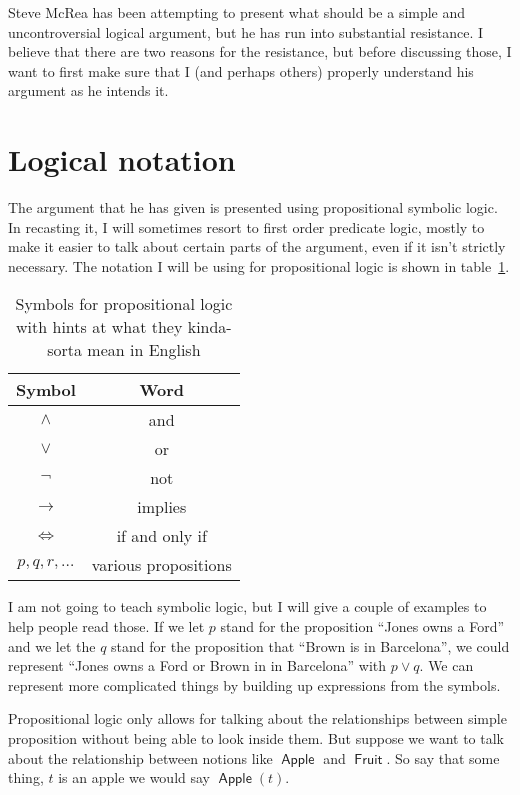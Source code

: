 \documentclass[12pt]{article}
\providecommand{\land}{\wedge}
\providecommand{\lor}{\vee}
\providecommand{\lif}{\rightarrow}
\providecommand{\liff}{\iff}
\providecommand{\lnot}{\neg}
\newcommand{\rel}[1]{\ensuremath{\mathop{\mathsf{#1}}}}
\newcommand{\rlapple}{\rel{Apple}}
\newcommand{\rlfruit}{\rel{Fruit}}
\begin{document}
Steve McRea has been attempting to present what should be a simple and uncontroversial logical argument, but he has run into substantial resistance.
I believe that there are two reasons for the resistance, but before discussing those, I want to first make sure that I (and perhaps others) properly understand his argument as he intends it.

\section{Logical notation}

The argument that he has given is presented using propositional symbolic logic.
In recasting it, I will sometimes resort to first order predicate logic, mostly to make it easier to talk about certain parts of the argument, even if it isn't strictly necessary. The notation I will be using for propositional logic is shown in table~\ref{tab:prop}. 

\begin{table}
    \begin{center}
    \begin{tabular}{cc}
        \toprule
        Symbol & Word \\
        \midrule
        $\land$ & and \\
        $\lor$  &  or \\
        $\lnot$ & not \\
        $\lif$  & implies \\
        $\liff$ & if and only if \\
        $p, q, r, \dots$ & various propositions \\
        \bottomrule  
    \end{tabular}
    \caption[Propositional logic symbols]{Symbols for propositional logic with hints at what they kinda-sorta mean in English}\label{tab:prop}
    \end{center}
\end{table}

I am not going to teach symbolic logic, but I will give a couple of examples to help people read those. If we let $p$ stand for the proposition “Jones owns a Ford” and we let the $q$ stand for the proposition that “Brown is in Barcelona”, we could represent “Jones owns a Ford or Brown in in Barcelona” with $p \lor q$.
We can represent more complicated things by building up expressions from the symbols.

Propositional logic only allows for talking about the relationships between simple proposition without being able to look inside them.
But suppose we want to talk about the relationship between notions like $\rlapple$ and $\rlfruit$. So say that some thing, $t$ is an apple we would say $\rlapple(t)$.
\end{document}
